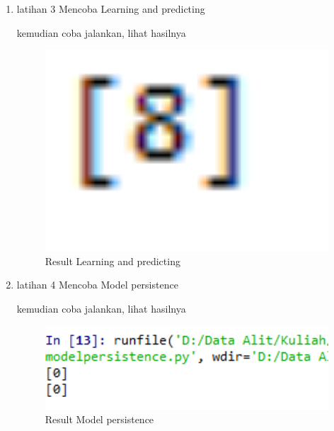 \begin{enumerate}
		\item latihan 3 Mencoba Learning and predicting
		
		\par kemudian coba jalankan, lihat hasilnya
		\begin{figure}[H]
		\centering
		\includegraphics[width=1\textwidth]{figures/1174057/chapter1/7.png}
		\caption{Result Learning and predicting}
		\label{print}
		\end{figure}

		\item latihan 4 Mencoba Model persistence
		
		\par kemudian coba jalankan, lihat hasilnya
		\begin{figure}[H]
		\centering
		\includegraphics[width=1\textwidth]{figures/1174057/chapter1/8.png}
		\caption{Result Model persistence}
		\label{print}
		\end{figure}


\end{enumerate}
